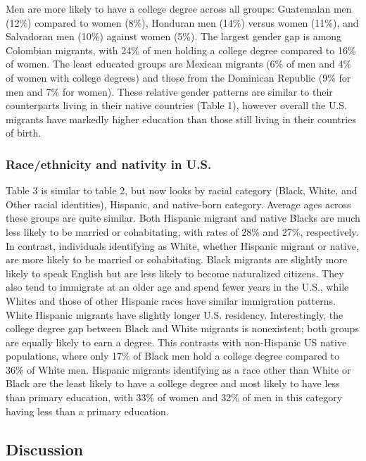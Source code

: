 \documentclass[
]{article}
\begin{document}
Men are more likely to have a college degree across all groups:
Guatemalan men (12\%) compared to women (8\%), Honduran men (14\%)
versus women (11\%), and Salvadoran men (10\%) against women (5\%). The
largest gender gap is among Colombian migrants, with 24\% of men holding
a college degree compared to 16\% of women. The least educated groups
are Mexican migrants (6\% of men and 4\% of women with college degrees)
and those from the Dominican Republic (9\% for men and 7\% for women).
These relative gender patterns are similar to their counterparts living
in their native countries (Table 1), however overall the U.S. migrants
have markedly higher education than those still living in their
countries of birth.

\subsubsection{Race/ethnicity and nativity in
U.S.}\label{raceethnicity-and-nativity-in-u.s.}

Table 3 is similar to table 2, but now looks by racial category (Black,
White, and Other racial identities), Hispanic, and native-born category.
Average ages across these groups are quite similar. Both Hispanic
migrant and native Blacks are much less likely to be married or
cohabitating, with rates of 28\% and 27\%, respectively. In contrast,
individuals identifying as White, whether Hispanic migrant or native,
are more likely to be married or cohabitating. Black migrants are
slightly more likely to speak English but are less likely to become
naturalized citizens. They also tend to immigrate at an older age and
spend fewer years in the U.S., while Whites and those of other Hispanic
races have similar immigration patterns. White Hispanic migrants have
slightly longer U.S. residency. Interestingly, the college degree gap
between Black and White migrants is nonexistent; both groups are equally
likely to earn a degree. This contrasts with non-Hispanic US native
populations, where only 17\% of Black men hold a college degree compared
to 36\% of White men. Hispanic migrants identifying as a race other than
White or Black are the least likely to have a college degree and most
likely to have less than primary education, with 33\% of women and 32\%
of men in this category having less than a primary education.

\subsection{Discussion}\label{discussion}
\end{document}
